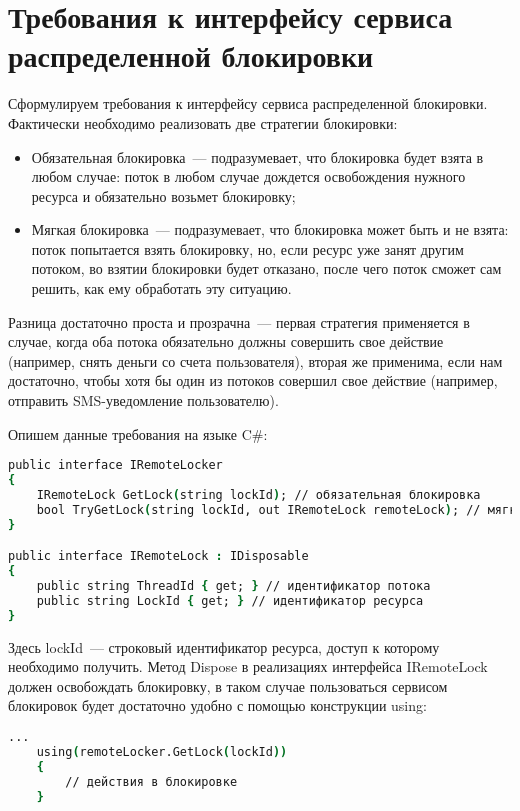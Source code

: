 \section{Требования к интерфейсу сервиса распределенной блокировки}

Сформулируем требования к интерфейсу сервиса распределенной блокировки. Фактически необходимо реализовать две стратегии блокировки:

\begin{itemize} 
	\item Обязательная блокировка~--- подразумевает, что блокировка будет взята в любом случае: поток в любом случае дождется освобождения нужного ресурса и обязательно возьмет блокировку;
	\item Мягкая блокировка~--- подразумевает, что блокировка может быть и не взята: поток попытается взять блокировку, но, если ресурс уже занят другим потоком, во взятии блокировки будет отказано, после чего поток сможет сам решить, как ему обработать эту ситуацию.
\end{itemize}

Разница достаточно проста и прозрачна~--- первая стратегия применяется в случае, когда оба потока обязательно должны совершить свое действие (например, снять деньги со счета пользователя), вторая же применима, если нам достаточно, чтобы хотя бы один из потоков совершил свое действие (например, отправить SMS-уведомление пользователю). 

Опишем данные требования на языке C\#:

\begin{lstlisting}[language=csh,caption={Описание интерфейса}]
public interface IRemoteLocker
{
	IRemoteLock GetLock(string lockId); // обязательная блокировка
	bool TryGetLock(string lockId, out IRemoteLock remoteLock); // мягкая блокировка
}

public interface IRemoteLock : IDisposable
{
	public string ThreadId { get; } // идентификатор потока
	public string LockId { get; } // идентификатор ресурса
}
\end{lstlisting}

Здесь lockId~--- строковый идентификатор ресурса, доступ к которому необходимо получить. Метод Dispose в реализациях интерфейса IRemoteLock должен освобождать блокировку, в таком случае пользоваться сервисом блокировок будет достаточно удобно с помощью конструкции using:

\begin{lstlisting}[language=csh,caption={Использование конструкции using}]
	...
	using(remoteLocker.GetLock(lockId))
	{
		// действия в блокировке
	}
\end{lstlisting}
